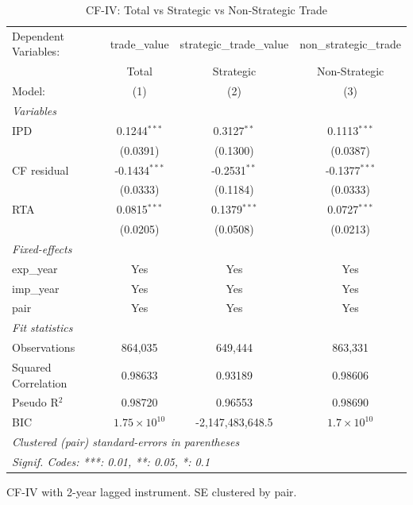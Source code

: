 
\begin{table}[htbp]
   \caption{CF-IV: Total vs Strategic vs Non-Strategic Trade}
   \centering
   \begin{tabular}{lccc}
      \tabularnewline \midrule \midrule
      Dependent Variables: & trade\_value          & strategic\_trade\_value   & non\_strategic\_trade\\    
                           & Total                 & Strategic                 & Non-Strategic \\   
      Model:               & (1)                   & (2)                       & (3)\\  
      \midrule
      \emph{Variables}\\
      IPD                  & 0.1244$^{***}$        & 0.3127$^{**}$             & 0.1113$^{***}$\\   
                           & (0.0391)              & (0.1300)                  & (0.0387)\\   
      CF residual          & -0.1434$^{***}$       & -0.2531$^{**}$            & -0.1377$^{***}$\\   
                           & (0.0333)              & (0.1184)                  & (0.0333)\\   
      RTA                  & 0.0815$^{***}$        & 0.1379$^{***}$            & 0.0727$^{***}$\\   
                           & (0.0205)              & (0.0508)                  & (0.0213)\\   
      \midrule
      \emph{Fixed-effects}\\
      exp\_year            & Yes                   & Yes                       & Yes\\  
      imp\_year            & Yes                   & Yes                       & Yes\\  
      pair                 & Yes                   & Yes                       & Yes\\  
      \midrule
      \emph{Fit statistics}\\
      Observations         & 864,035               & 649,444                   & 863,331\\  
      Squared Correlation  & 0.98633               & 0.93189                   & 0.98606\\  
      Pseudo R$^2$         & 0.98720               & 0.96553                   & 0.98690\\  
      BIC                  & $1.75\times 10^{10}$  & -2,147,483,648.5          & $1.7\times 10^{10}$\\   
      \midrule \midrule
      \multicolumn{4}{l}{\emph{Clustered (pair) standard-errors in parentheses}}\\
      \multicolumn{4}{l}{\emph{Signif. Codes: ***: 0.01, **: 0.05, *: 0.1}}\\
   \end{tabular}
   
   \par \raggedright 
   CF-IV with 2-year lagged instrument. SE clustered by pair.
\end{table}


